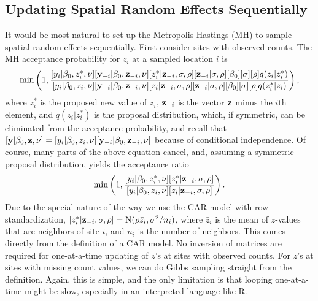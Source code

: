 \documentclass[11pt, titlepage]{article}
\begin{document}
\begin{spacing}{1.9}
\begin{flushleft}
\internallinenumbers


\subsection{Updating Spatial Random Effects Sequentially}

It would be most natural to set up the Metropolis-Hastings (MH) to sample spatial random effects sequentially. First consider sites with observed counts. The MH acceptance probability for $z_{i}$ at a sampled location $i$ is
$$
\min\left(1,\frac{[y_{i}|\beta_{0},z^{*}_{i},\nu][\mathbf{y}_{-i}|\beta_{0},\mathbf{z}_{-i},\nu][z^{*}_{i}|\mathbf{z}_{-i},\sigma,\rho][\mathbf{z}_{-i}|\sigma,\rho][\beta_{0}] [\sigma] [\rho]q(z_{i}|z_{i}^{*})}
	{[y_{i}|\beta_{0},z_{i},\nu][\mathbf{y}_{-i}|\beta_{0},\mathbf{z}_{-i},\nu][z_{i}|\mathbf{z}_{-i},\sigma,\rho][\mathbf{z}_{-i}|\sigma,\rho][\beta_{0}] [\sigma] [\rho]q(z_{i}^{*}|z_{i})}\right),
$$
where $z_{i}^{*}$ is the proposed new value of $z_{i}$,  $\mathbf{z}_{-i}$ is the vector $\mathbf{z}$ minus the $i$th element, and $q(z_{i}|z_{i}^{*})$ is the proposal distribution, which, if symmetric, can be eliminated from the acceptance probability, and recall that $[\mathbf{y}|\beta_{0},\mathbf{z},\nu] = [y_{i}|\beta_{0},z_{i},\nu][\mathbf{y}_{-i}|\beta_{0},\mathbf{z}_{-i},\nu]$ because of conditional independence. Of course, many parts of the above equation cancel, and, assuming a symmetric proposal distribution, yields the acceptance ratio
$$
\min\left(1,\frac{[y_{i}|\beta_{0},z^{*}_{i},\nu][z^{*}_{i}|\mathbf{z}_{-i},\sigma,\rho]}
	{[y_{i}|\beta_{0},z_{i},\nu][z_{i}|\mathbf{z}_{-i},\sigma,\rho]}\right).
$$
Due to the special nature of the way we use the CAR model with row-standardization, $[z^{*}_{i}|\mathbf{z}_{-i},\sigma,\rho] = \textrm{N}(\rho\bar{z}_{i},\sigma^{2}/n_{i})$, where $\bar{z}_{i}$ is the mean of $z$-values that are neighbors of site $i$, and $n_{i}$ is the number of neighbors. This comes directly from the definition of a CAR model. No inversion of matrices are required for one-at-a-time updating of $z$'s at sites with observed counts.  For $z$'s at sites with missing count values, we can do Gibbs sampling straight from the definition.  Again, this is simple, and the only limitation is that looping one-at-a-time might be slow, especially in an interpreted language like R.



\end{flushleft}
\end{spacing}
\end{document}
